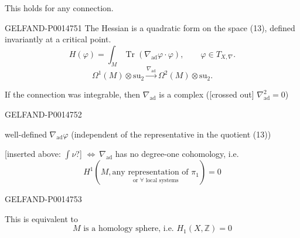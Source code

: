 This holds for any connection.


\begin{GelfandAdjacentEvidence}{GELFAND-P001475}{1}
The Hessian is a quadratic form on the space (13), defined invariantly at a critical point.
\begin{equation*}
H(\varphi)=\int_M\operatorname{Tr}(\nabla_{\mathrm{ad}}\varphi\cdot\varphi),\qquad
\varphi\in T_{X,\nabla}.
\tag{14}
\end{equation*}
\begin{equation*}
\Omega^1(M)\otimes\mathrm{su}_2
\xrightarrow{\nabla_{\mathrm{ad}}}\Omega^2(M)\otimes\mathrm{su}_2.
\tag{15}
\end{equation*}

If the connection was integrable, then \(\nabla_{\mathrm{ad}}\) is a complex
([crossed out] \(\nabla_{\mathrm{ad}}^2=0\))

\end{GelfandAdjacentEvidence}
\begin{GelfandAdjacentEvidence}{GELFAND-P001475}{2}


well-defined \(\nabla_{\mathrm{ad}}\varphi\) (independent of the representative in the quotient (13))

 [inserted above: \(\int\nu\)?]
\(\Longleftrightarrow\ \nabla_{\mathrm{ad}}\) has no degree-one cohomology, i.e.
\begin{equation*}
H^1\!\left(M,\underset{\text{or \(\forall\) local systems}}{\text{any representation of }\pi_1}\right)=0
\tag{16}
\end{equation*}
\end{GelfandAdjacentEvidence}
\begin{GelfandAdjacentEvidence}{GELFAND-P001475}{3}


This is equivalent to
\begin{equation*}
M\text{ is a homology sphere, i.e. }H_1(X,\mathbb Z)=0
\tag{17}
\end{equation*}
\end{GelfandAdjacentEvidence}
